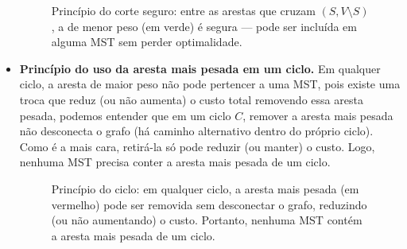 \documentclass[12pt,a4paper]{article}
\def\emph#1{#1}%
\begin{document}
\begin{itemize}
\begin{figure}[htbp]
    \caption{Princípio do corte seguro: entre as arestas que cruzam \((S, V\setminus S)\), a de menor peso (em verde) é \emph{segura} — pode ser incluída em alguma MST sem perder optimalidade.}
    \label{fig:mst-cut-safe}
\end{figure}
    \item \textbf{Princípio do uso da aresta mais pesada em um ciclo.} Em qualquer \emph{ciclo}, a aresta de maior peso \emph{não} pode pertencer a uma MST, pois existe uma troca que reduz (ou não aumenta) o custo total removendo essa aresta pesada, podemos entender que em um ciclo \(C\), remover a aresta \emph{mais pesada} não desconecta o grafo (há caminho alternativo dentro do próprio ciclo). Como é a mais cara, retirá-la só pode reduzir (ou manter) o custo. Logo, nenhuma MST precisa conter a aresta mais pesada de um ciclo.

\begin{figure}[htbp]
    \centering
    \caption{Princípio do ciclo: em qualquer ciclo, a aresta mais pesada (em vermelho) pode ser removida sem desconectar o grafo, reduzindo (ou não aumentando) o custo. Portanto, nenhuma MST contém a aresta mais pesada de um ciclo.}
    \label{fig:mst-cycle-heavy}
\end{figure}
\end{itemize}
\end{document}
